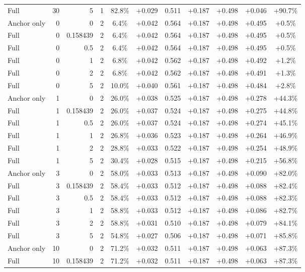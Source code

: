 \begin{table}[htbp]
\begin{tabular}{lrrrccccccc}
Full & 30 & 5 & 1 & 82.8\% & +0.029 & 0.511 & +0.187 & +0.498 & +0.046 & +90.7\% \\
Anchor only & 0 & 0 & 2 & 6.4\% & +0.042 & 0.564 & +0.187 & +0.498 & +0.495 & +0.5\% \\
Full & 0 & 0.158439 & 2 & 6.4\% & +0.042 & 0.564 & +0.187 & +0.498 & +0.495 & +0.5\% \\
Full & 0 & 0.5 & 2 & 6.4\% & +0.042 & 0.564 & +0.187 & +0.498 & +0.495 & +0.5\% \\
Full & 0 & 1 & 2 & 6.8\% & +0.042 & 0.562 & +0.187 & +0.498 & +0.492 & +1.2\% \\
Full & 0 & 2 & 2 & 6.8\% & +0.042 & 0.562 & +0.187 & +0.498 & +0.491 & +1.3\% \\
Full & 0 & 5 & 2 & 10.0\% & +0.040 & 0.561 & +0.187 & +0.498 & +0.484 & +2.8\% \\
Anchor only & 1 & 0 & 2 & 26.0\% & +0.038 & 0.525 & +0.187 & +0.498 & +0.278 & +44.3\% \\
Full & 1 & 0.158439 & 2 & 26.0\% & +0.037 & 0.524 & +0.187 & +0.498 & +0.275 & +44.8\% \\
Full & 1 & 0.5 & 2 & 26.0\% & +0.037 & 0.524 & +0.187 & +0.498 & +0.274 & +45.1\% \\
Full & 1 & 1 & 2 & 26.8\% & +0.036 & 0.523 & +0.187 & +0.498 & +0.264 & +46.9\% \\
Full & 1 & 2 & 2 & 28.8\% & +0.033 & 0.522 & +0.187 & +0.498 & +0.254 & +48.9\% \\
Full & 1 & 5 & 2 & 30.4\% & +0.028 & 0.515 & +0.187 & +0.498 & +0.215 & +56.8\% \\
Anchor only & 3 & 0 & 2 & 58.0\% & +0.033 & 0.513 & +0.187 & +0.498 & +0.090 & +82.0\% \\
Full & 3 & 0.158439 & 2 & 58.4\% & +0.033 & 0.512 & +0.187 & +0.498 & +0.088 & +82.4\% \\
Full & 3 & 0.5 & 2 & 58.4\% & +0.033 & 0.512 & +0.187 & +0.498 & +0.088 & +82.3\% \\
Full & 3 & 1 & 2 & 58.8\% & +0.033 & 0.512 & +0.187 & +0.498 & +0.086 & +82.7\% \\
Full & 3 & 2 & 2 & 58.8\% & +0.031 & 0.510 & +0.187 & +0.498 & +0.079 & +84.1\% \\
Full & 3 & 5 & 2 & 54.8\% & +0.027 & 0.506 & +0.187 & +0.498 & +0.071 & +85.8\% \\
Anchor only & 10 & 0 & 2 & 71.2\% & +0.032 & 0.511 & +0.187 & +0.498 & +0.063 & +87.3\% \\
Full & 10 & 0.158439 & 2 & 71.2\% & +0.032 & 0.511 & +0.187 & +0.498 & +0.063 & +87.3\% \\

\end{tabular}
\end{table}
